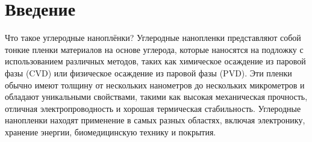 \documentclass[14pt]{extarticle}
\begin{document}
\tableofcontents





\section{Введение}

Что такое углеродные наноплёнки?
Углеродные нанопленки представляют собой тонкие пленки материалов на основе углерода, которые наносятся на подложку с использованием различных методов, таких как химическое осаждение из паровой фазы (CVD) или физическое осаждение из паровой фазы (PVD). Эти пленки обычно имеют толщину от нескольких нанометров до нескольких микрометров и обладают уникальными свойствами, такими как высокая механическая прочность, отличная электропроводность и хорошая термическая стабильность. Углеродные нанопленки находят применение в самых разных областях, включая электронику, хранение энергии, биомедицинскую технику и покрытия.



\end{document}
